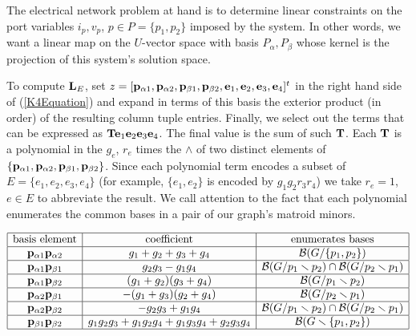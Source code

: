 The electrical network problem at hand is to determine linear constraints on the
port variables $i_p, v_p$, $p\in P = \{p_1, p_2\}$ imposed by the system.  In other words,
we want a linear map on the $U$-vector space with basis $P_\alpha, P_\beta$ whose kernel
is the projection of this system's solution space.

To compute $\mathbf{L}_E$, set 
$z=[\mathbf{p}_{\alpha 1},\mathbf{p}_{\alpha 2},\mathbf{p}_{\beta 1},\mathbf{p}_{\beta 2},
  \mathbf{e}_1,  \mathbf{e}_2,  \mathbf{e}_3,  \mathbf{e}_4]^t$
in the right hand side of (\ref{K4Equation}) 
and expand in terms of this basis
the exterior product (in order) of the resulting column tuple entries.
Finally, we select out
the terms that can be expressed as $\mathbf{T}\mathbf{e}_1\mathbf{e}_2\mathbf{e}_3\mathbf{e}_4$.  The final
value is the sum of such $\mathbf{T}$.  Each $\mathbf{T}$ is a polynomial in the $g_e$, $r_e$
times the $\wedge$ of two distinct elements of
$\{\mathbf{p}_{\alpha 1}, \mathbf{p}_{\alpha 2}, \mathbf{p}_{\beta 1}, \mathbf{p}_{\beta 2}\}$.  Since each polynomial
term encodes a subset of $E=\{e_1, e_2, e_3, e_4\}$ (for example, $\{e_1, e_2\}$ is encoded
by $g_1g_2r_3r_4$) we take $r_e=1$, $e\in E$ to abbreviate the result. We call attention
to the fact that each polynomial enumerates
the common bases in a pair of our graph's matroid minors.


\begin{equation}\label{K4table}
\begin{array}{|c|c|c|} \hline
\text{basis element} & \text{coefficient} & \text{enumerates bases}\\
  \hline

\mathbf{p}_{\alpha 1}\mathbf{p}_{\alpha 2} &
g_1 + g_2 + g_3 + g_4 & \mathcal{B}(G/\{p_1, p_2\})

\\ \hline

\mathbf{p}_{\alpha 1}\mathbf{p}_{\beta 1} &
g_2g_3 - g_1g_4 &  \mathcal{B}(G/p_1\smallsetminus p_2)\cap\mathcal{B}(G/p_2\smallsetminus p_1)

\\ \hline

\mathbf{p}_{\alpha 1}\mathbf{p}_{\beta 2} &
(g_1 + g_2)(g_3 + g_4) & \mathcal{B}(G/p_1\smallsetminus p_2)
\\ \hline 

\mathbf{p}_{\alpha 2}\mathbf{p}_{\beta 1} & -(g_1 + g_3)(g_2+g_4) & \mathcal{B}(G/p_2\smallsetminus p_1)
\\ \hline
 
\mathbf{p}_{\alpha 2}\mathbf{p}_{\beta 2} &
-g_2g_3 + g_1g_4 & \mathcal{B}(G/p_1\smallsetminus p_2)\cap\mathcal{B}(G/p_2\smallsetminus p_1)
\\ \hline
 
\mathbf{p}_{\beta 1}\mathbf{p}_{\beta 2} &
g_1g_2g_3 + g_1g_2g_4 + g_1g_3g_4 + g_2g_3g_4 & \mathcal{B}(G\smallsetminus \{p_1, p_2\})
\\ \hline

\end{array}
\end{equation}







